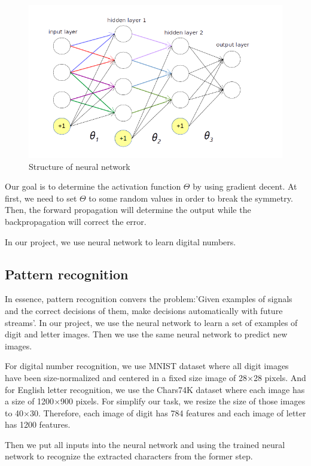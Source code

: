 \documentclass[paper=a4, french, 11pt]{scrartcl}
\begin{document}
\begin{figure}[h]
\begin{center}
	\vspace{-1ex}
   \includegraphics[width=0.75\linewidth]{network.png}
\end{center}
\vspace{-4ex}
\caption{Structure of neural network}
\label{fig:heatmap}
\end{figure}

Our goal is to determine the activation function $\Theta$ by using gradient decent. At first, we need to set $\Theta$ to some random values in order to break the symmetry. Then, the forward propagation will determine the output while the backpropagation will correct the error.

In our project, we use neural network to learn digital numbers.

\subsection{Pattern recognition}
In essence, pattern recognition convers the problem:'Given examples of signals and the correct decisions of them, make decisions automatically with future streams'. In our project, we use the neural network to learn a set of examples of digit and letter images. Then we use the same neural network to predict new images.

For digital number recognition, we use MNIST dataset where all digit images have been size-normalized and centered in a fixed size image of 28$\times$28 pixels. And for English letter recognition, we use the Chars74K dataset where each image has a size of 1200$\times$900 pixels. For simplify our task, we resize the size of those images to 40$\times$30. Therefore, each image of digit has 784 features and each image of letter has 1200 features.

Then we put all inputs into the neural network and using the trained neural network to recognize the extracted characters from the former step.
\end{document}
